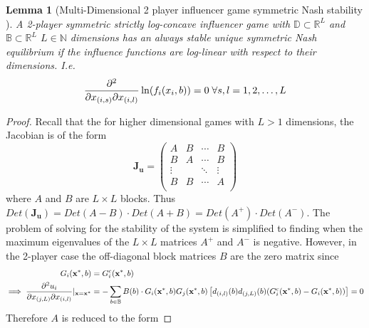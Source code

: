 \documentclass{article}
\newtheorem{lemma}[theorem]{Lemma}
\newcommand {\R}{\mathbb{R}}
\newcommand {\N}{\mathbb{N}}
\newcommand {\D}{\mathbb{D}}
\newcommand {\B}{\mathbb{B}}
\begin{document}
                \begin{lemma}[Multi-Dimensional 2 player influencer game symmetric Nash stability ] \label{lem:SI_two_player_stability_multi_dim}
                    A 2-player symmetric strictly log-concave influencer game with $\D\subset \R^L$ and $\B\subset \R^L$ $L\in \N$ dimensions has an always stable unique symmetric Nash equilibrium if the influence functions are log-linear with respect to their dimensions. I.e. 
                    \begin{equation}
                        \pdv{}{x_{(i,s)}}{x_{(i,l)}}\ln(f_{i}(x_i,b))=0 \;\forall s,l=1,2,\dots,L
                    \end{equation}
                \end{lemma}
                \begin{proof}
                    Recall that the for higher dimensional games with $L>1$ dimensions, the Jacobian is of the form
                    \begin{equation}
                        \mathbf{J}_{\mathbf{u}}=\begin{pmatrix}
                            A & B& \cdots & B \\ %
                            B & A & \cdots & B \\ %
                            \vdots &  & \ddots &\vdots  \\ %
                            B& B & \cdots & A \\ %
                            \end{pmatrix}
                    \end{equation}
                    where $A$ and $B$ are $L\times L$ blocks. Thus $Det(\mathbf{J}_{\mathbf{u}})=Det(A-B)\cdot Det(A+B)=Det(A^+)\cdot Det(A^-)$. The problem of solving for the stability of the system is simplified to finding when the maximum eigenvalues of the $L \times L$ matrices $A^+$ and $A^-$ is negative. However, in the 2-player case the off-diagonal block matrices $B$ are the zero matrix since
                    \begin{align}
                        G_i(\mathbf{x}^*,b)&=G^c_i(\mathbf{x}^*,b)\\
                        \implies \pdv[2]{u_i}{x_{(j,L)}}{x_{(i,l)}}|_{\mathbf{x}=\mathbf{x}^*}&=-\sum_{b\in\mathbb{B}} B(b)\cdot G_i(\mathbf{x}^*,b) G_j(\mathbf{x}^*,b)\left[ d_{(i,l)}(b) d_{(j,L)}(b)(G_i^c(\mathbf{x}^*,b) -G_i(\mathbf{x}^*,b) )\right]=0
                    \end{align}
                    Therefore $A$ is reduced to the form 

\end{proof}
\end{document}
